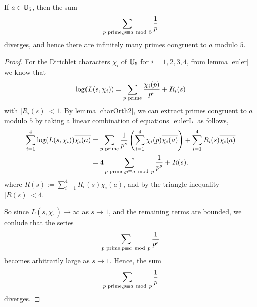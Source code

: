\documentclass{unswmaths}
\begin{document}
    \begin{theorem}
        If $a \in \mathbb{U}_5$, then the sum
        \begin{equation*}
            \sum_{{p\text{ prime}}, p \equiv a \;\operatorname{mod}\;5} \frac{1}{p}
        \end{equation*}
        diverges, and hence there are infinitely many primes congruent to $a$ modulo $5$.
    \end{theorem}
    \begin{proof}
        For the Dirichlet characters $\chi_i$ of $\mathbb{U}_5$ for $i = 1,2,3,4$, from lemma \ref{euler} we know that
        \begin{equation*}
        \label{eulerL}
            \log(L(s,\chi_i)) = \sum_{{p\text{ prime}}} \frac{\chi_i(p)}{p^s}+R_i(s)
        \end{equation*}
        with $|R_i(s)| < 1$. By lemma \ref{charOrth2}, we can extract primes congruent to $a$ modulo $5$
        by taking a linear combination of equations \ref{eulerL} as follows,
        \begin{align*}
            \sum_{i=1}^4 \log(L(s,\chi_i))\overline{\chi_i(a)} &= \sum_{{p\text{ prime}}} \frac{1}{p^s}\left(\sum_{i=1}^4 \chi_i(p)\overline{\chi_i(a)}\right) + \sum_{i=1}^4 R_i(s)\overline{\chi_i(a)}\\
            &= 4\sum_{{p\text{ prime}}, p\equiv a\;\operatorname{mod}\;p} \frac{1}{p^s} + R(s).
        \end{align*}
        where $R(s) := \sum_{i=1}^4 R_i(s)\overline{\chi_i(a)}$, and by the triangle inequality $|R(s)| < 4$.
        
        So since $L(s,\chi_1) \rightarrow \infty$ as $s\rightarrow 1$, and the remaining terms are bounded, we
        conlude that the series
        \begin{equation*}
            \sum_{{p\text{ prime}}, p\equiv a\;\operatorname{mod}\;p} \frac{1}{p^s}
        \end{equation*}
        becomes arbitrarily large as $s\rightarrow 1$. Hence, 
        the sum
        \begin{equation*}
            \sum_{{p\text{ prime}}, p\equiv a\;\operatorname{mod}\;p} \frac{1}{p}
        \end{equation*}
        diverges.
    \end{proof} 
    
    
\end{document}
